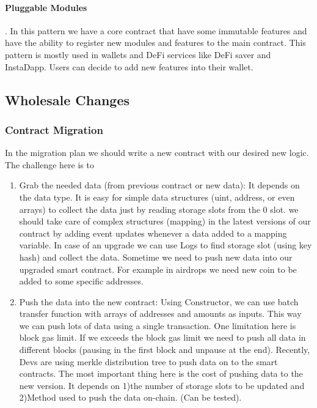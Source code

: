 \paragraph{Pluggable Modules}. In this pattern we have a core contract that have some immutable features and have the ability to register new modules and features to the main contract. This pattern is mostly used in wallets and DeFi services like DeFi saver and InstaDapp. Users can decide to add new features into their wallet. 

\subsection{Wholesale Changes}

\subsubsection{Contract Migration}

In the migration plan we should write a new contract with our desired new logic. The challenge here is to 
\begin{enumerate}
    \item Grab the needed data (from previous contract or new data): 
    It depends on the data type. It is easy for simple data structures (\eg uint, address, or even arrays) to collect the data just by reading storage slots from the 0 slot. we should take care of complex structures (\eg mapping) in the latest versions of our contract by adding event updates whenever a data added to a mapping variable. In case of an upgrade we can use Logs to find storage slot (using key hash) and collect the data.
    Sometime we need to push new data into our upgraded smart contract. For example in airdrops we need new coin to be added to some specific addresses. 
    \item Push the data into the new contract: 
    Using Constructor, we can use batch transfer function with arrays of addresses and amounts as inputs. This way we can push lots of data using a single transaction. One limitation here is block gas limit. If we exceeds the block gas limit we need to push all data in different blocks (pausing in the first block and unpause at the end). Recently, Devs are using merkle distribution tree to push data on to the smart contracts.
    The most important thing here is the cost of pushing data to the new version. It depends on 1)the number of storage slots to be updated and 2)Method used to push the data on-chain. (Can be tested). 
  \end{enumerate}

